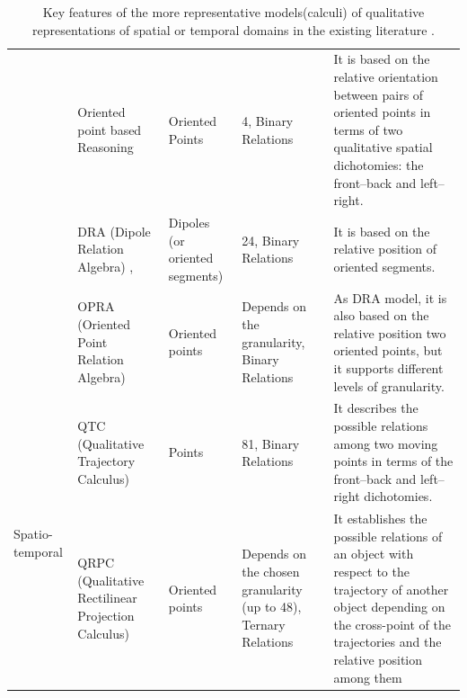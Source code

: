 \begin{table}[h!]
\begin{adjustwidth}{-2cm}{}
{\begin{tabular}{|p{3cm}|p{4cm}|p{3cm}|p{3cm}|p{8cm}|}
						& Oriented point based Reasoning  \cite{moratz2006representing}& Oriented Points & 4, Binary Relations & It is based on the relative orientation between pairs of oriented points in terms of two qualitative spatial dichotomies: the front–back and left–right. \\ \cline{2-5} 
						& DRA (Dipole Relation Algebra)  \cite{dylla2004empirical}, \cite{dylla2004exploiting} & Dipoles (or oriented segments) & 24, Binary Relations & It is based on the relative position of oriented segments. \\ \cline{2-5} 
						& OPRA (Oriented Point Relation Algebra)  \cite{dylla2006generalizing} & Oriented points & Depends on the granularity, Binary Relations & As DRA model, it is also based on the relative position two oriented points, but it supports different levels of granularity. \\ \hline
						\multirow{2}{*}{Spatio-temporal} & QTC (Qualitative Trajectory Calculus)  \cite{van2005representing} & Points & 81, Binary Relations & It describes the possible relations among two moving points in terms of the front–back and left–right dichotomies. \\ \cline{2-5} 
						& QRPC (Qualitative Rectilinear Projection Calculus)  \cite{glez2013qrpc} & Oriented points & Depends on the chosen granularity (up to 48), Ternary Relations & It establishes the possible relations of an object with respect to the trajectory of another object depending on the cross-point of the trajectories and the relative position among them \\ \hline
				\end{tabular}}
			\caption{Key features of the more representative models(calculi) of qualitative representations of spatial or temporal domains in the existing literature \cite{glez2013qrpc}.}
			\end{adjustwidth}
		\end{table}
	
			\newpage
	
